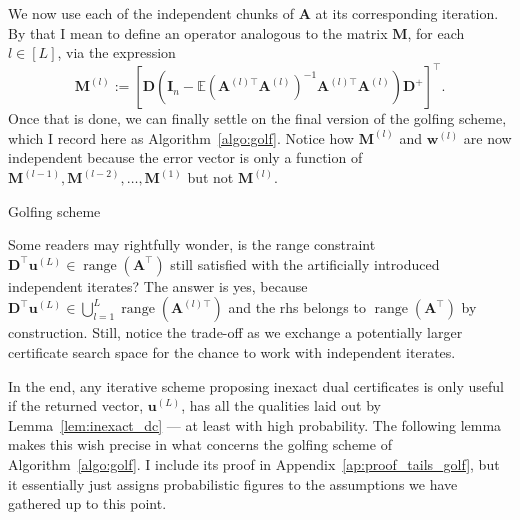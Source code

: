 We now use each of the independent chunks of $\mathbf{A}$ at its corresponding iteration. By that I mean to  define an operator analogous to the matrix $\mathbf{M}$, for each $l \in [L]$, via the expression
\begin{equation}\label{eq:def_M^l}
    \mathbf{M}^{(l)} := \left[ \mathbf{D} \left( \mathbf{I}_n - \mathbb{E} \left ( \mathbf{A}^{(l)\top}\mathbf{A}^{(l)} \right )^{-1} \mathbf{A}^{(l)\top} \mathbf{A}^{(l)} \right) \mathbf{D}^+ \right]^{\top}.
\end{equation}
Once that is done, we can finally settle on the final version of the golfing scheme, which I record here as Algorithm~\ref{algo:golf}. Notice how $\mathbf{M}^{(l)}$ and $ \mathbf{w}^{(l)}$ are now independent because the error vector is only a function of $\mathbf{M}^{(l-1)}, \mathbf{M}^{(l-2)}, \dots, \mathbf{M}^{(1)}$ but not $\mathbf{M}^{(l)}$.

\begin{algorithm}[H]
    \caption{Golfing scheme}\label{algo:golf}
	\begin{algorithmic}[1]
        \EndFor
    \end{algorithmic}
\end{algorithm}

Some readers may rightfully wonder, is the range constraint $\mathbf{D}^{\top}\mathbf{u}^{(L)} \in \operatorname{range} \left ( \mathbf{A^{\top}} \right )$ still satisfied with the artificially introduced independent iterates? The answer is yes, because $\mathbf{D}^{\top}\mathbf{u}^{(L)} \in \bigcup_{l=1}^{L} \operatorname{range} \left( \mathbf{A}^{(l)\top} \right)$ and the \acrlong{rhs} belongs to $\operatorname{range} \left( \mathbf{A}^\top \right)$ by construction. Still, notice the trade-off as we exchange a potentially larger certificate search space for the chance to work with independent iterates.

In the end, any iterative scheme proposing inexact dual certificates is only useful if the returned vector, $\mathbf{u}^{(L)}$, has all the qualities laid out by Lemma~\ref{lem:inexact_dc} --- at least with high probability. The following lemma makes this wish precise in what concerns the golfing scheme of Algorithm~\ref{algo:golf}. I include its proof in Appendix~\ref{ap:proof_tails_golf}, but it essentially just assigns probabilistic figures to the assumptions we have gathered up to this point.

